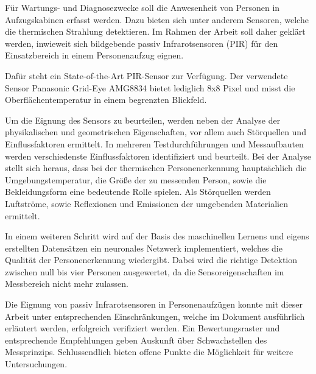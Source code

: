 Für Wartungs- und Diagnosezwecke soll die Anwesenheit von Personen in Aufzugskabinen erfasst werden. Dazu bieten sich unter anderem Sensoren, welche die thermischen Strahlung detektieren. Im Rahmen der Arbeit soll daher geklärt werden, inwieweit sich bildgebende passiv Infrarotsensoren (PIR) für den Einsatzbereich in einem Personenaufzug eignen. 

Dafür steht ein State-of-the-Art PIR-Sensor zur Verfügung. Der verwendete Sensor Panasonic Grid-Eye AMG8834 bietet lediglich 8x8 Pixel und misst die Oberflächentemperatur in einem begrenzten Blickfeld.  

Um die Eignung des Sensors zu beurteilen, werden neben der Analyse der physikalischen und geometrischen Eigenschaften, vor allem auch Störquellen und Einflussfaktoren ermittelt. In mehreren Testdurchführungen und Messaufbauten werden verschiedenste Einflussfaktoren identifiziert und beurteilt. Bei der Analyse stellt sich heraus, dass bei der thermischen Personenerkennung hauptsächlich die Umgebungstemperatur, die Größe der zu messenden Person, sowie die Bekleidungsform eine bedeutende Rolle spielen. Als Störquellen werden Luftströme, sowie Reflexionen und Emissionen der umgebenden Materialien ermittelt.  

In einem weiteren Schritt wird auf der Basis des maschinellen Lernens und eigens erstellten Datensätzen ein neuronales Netzwerk implementiert, welches die Qualität der Personenerkennung wiedergibt. Dabei wird die richtige Detektion zwischen null bis vier Personen ausgewertet, da die Sensoreigenschaften im Messbereich nicht mehr zulassen. 

Die Eignung von passiv Infrarotsensoren in Personenaufzügen konnte mit dieser Arbeit unter entsprechenden Einschränkungen, welche im Dokument ausführlich erläutert werden, erfolgreich verifiziert werden.
Ein Bewertungsraster und entsprechende Empfehlungen geben Auskunft über Schwachstellen des Messprinzips. Schlussendlich bieten offene Punkte die Möglichkeit für weitere Untersuchungen.   



